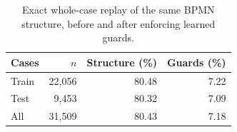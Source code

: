\begin{table}[t]
\centering
\caption{Exact whole-case replay of the same BPMN structure, before and after enforcing learned guards.}
\label{tab:guarded-coverage}
\begin{tabular}{lrrr}
\hline
Cases & $n$ & Structure (\%) & Guards (\%) \\
\hline
Train & 22,056 & 80.48 & 7.22 \\
Test & 9,453 & 80.32 & 7.09 \\
All & 31,509 & 80.43 & 7.18 \\
\hline
\end{tabular}
\end{table}
